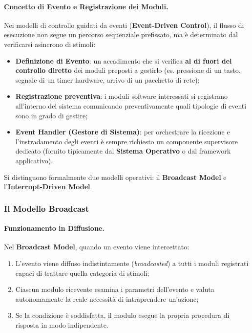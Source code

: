 \documentclass[12pt]{extarticle}
\begin{document}
\paragraph{Concetto di Evento e Registrazione dei Moduli.}
Nei modelli di controllo guidati da eventi (\textbf{Event-Driven Control}), il flusso di esecuzione non segue un percorso sequenziale prefissato, ma è determinato dal verificarsi asincrono di stimoli:
\begin{itemize}
    \item \textbf{Definizione di Evento}: un accadimento che si verifica \textbf{al di fuori del controllo diretto} dei moduli preposti a gestirlo (es. pressione di un tasto, segnale di un timer hardware, arrivo di un pacchetto di rete);
    \item \textbf{Registrazione preventiva}: i moduli software interessati si registrano all'interno del sistema comunicando preventivamente quali tipologie di eventi sono in grado di gestire;
    \item \textbf{Event Handler (Gestore di Sistema)}: per orchestrare la ricezione e l'instradamento degli eventi è sempre richiesto un componente supervisore dedicato (fornito tipicamente dal \textbf{Sistema Operativo} o dal framework applicativo).
\end{itemize}

\noindent Si distinguono formalmente due modelli operativi: il \textbf{Broadcast Model} e l'\textbf{Interrupt-Driven Model}.

\subsubsection{Il Modello Broadcast}

\paragraph{Funzionamento in Diffusione.}
Nel \textbf{Broadcast Model}, quando un evento viene intercettato:
\begin{enumerate}
    \item L'evento viene diffuso indistintamente (\textit{broadcasted}) a tutti i moduli registrati capaci di trattare quella categoria di stimoli;
    \item Ciascun modulo ricevente esamina i parametri dell'evento e valuta autonomamente la reale necessità di intraprendere un'azione;
    \item Se la condizione è soddisfatta, il modulo esegue la propria procedura di risposta in modo indipendente.
\end{enumerate}
\end{document}
